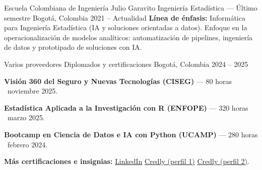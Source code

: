 
\begin{cventries}

  \cventry
    {Escuela Colombiana de Ingeniería Julio Garavito}
    {Ingeniería Estadística --- Último semestre}
    {Bogotá, Colombia}
    {2021 -- Actualidad}
    {
      \vspace{0.3em}
      {\textbf{Línea de énfasis:} Informática para Ingeniería Estadística (IA y soluciones orientadas a datos).
      Enfoque en la operacionalización de modelos analíticos: automatización de pipelines, ingeniería de datos y prototipado de soluciones con IA.}
    }

  \vspace{0.6em}

  \cventry
    {Varios proveedores}
    {Diplomados y certificaciones}
    {Bogotá, Colombia}
    {2024 -- 2025}
    {
      \begin{cvitems}
        \item {\textbf{Visión 360 del Seguro y Nuevas Tecnologías (CISEG)} --- 80 horas \textbar\ noviembre 2025.}
        \item {\textbf{Estadística Aplicada a la Investigación con R (ENFOPE)} --- 320 horas \textbar\ marzo 2025.}
        \item {\textbf{Bootcamp en Ciencia de Datos e IA con Python (UCAMP)} --- 280 horas \textbar\ febrero 2024.}
        \item {\textbf{Más certificaciones e insignias:} \href{https://linkedin.com/in/juan-sebastian-ramirez-ayala-021366281/}{LinkedIn} \quad\textbar\quad \href{https://www.credly.com/users/juan-sebastian-ramirez-ayala}{Credly (perfil 1)} \quad\textbar\quad \href{https://www.credly.com/users/sebastian-ramirez.6d8f476f}{Credly (perfil 2)}.}
      \end{cvitems}
    }


\end{cventries}

